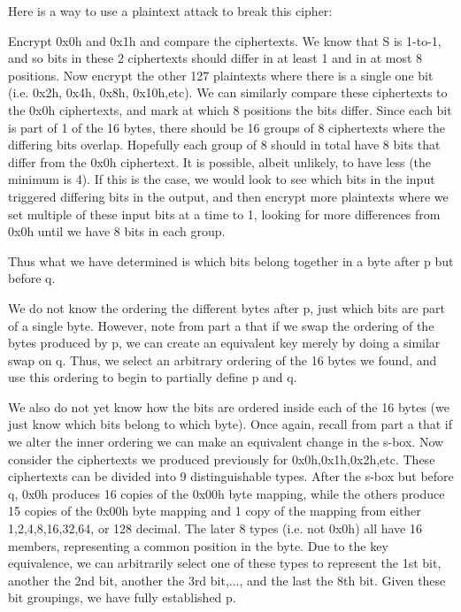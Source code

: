\documentclass[11pt]{article}
\begin{document}
\begin{enumerate}[(a)]
Here is a way to use a plaintext attack to break this cipher:

Encrypt 0x0h and 0x1h and compare the ciphertexts. We know that S is 1-to-1, and so bits in these 2 ciphertexts should differ in at least 1 and in at most 8 positions. Now encrypt  the other 127 plaintexts where there is a single one bit (i.e. 0x2h, 0x4h, 0x8h, 0x10h,etc). We can similarly compare these ciphertexts to the 0x0h ciphertexts, and mark at which 8 positions the bits differ. Since each bit is part of 1 of the 16 bytes, there should be 16 groups of 8 ciphertexts where the differing bits overlap. Hopefully each group of 8 should in total have 8 bits that differ from the 0x0h ciphertext. It is possible, albeit unlikely, to have less (the minimum is 4). If this is the case, we would look
to see which bits in the input triggered differing bits in the output, and then encrypt more plaintexts where we set multiple of these input
bits at a time to 1, looking for more differences from 0x0h until we have 8 bits in each group.

Thus what we have determined is which bits belong together in a byte after p but before q.

We do not know the ordering the different bytes after p, just which bits are part of a single byte. However, note from part a that if we swap the ordering of the bytes produced by p, we can create an equivalent key merely by doing a similar swap on q. Thus, we select an arbitrary ordering of the 16 bytes we found, and use this ordering to begin to partially define p and q.

We also do not yet know how the bits are ordered inside each of the 16 bytes (we just know which bits belong to which byte). Once again, recall from part a that if we alter the inner ordering we can make an equivalent change in the s-box. Now consider the ciphertexts we produced previously for 0x0h,0x1h,0x2h,etc. These ciphertexts can be divided into 9 distinguishable types. After the s-box but before q, 0x0h produces 16 copies of the 0x00h byte mapping, while the others produce 15 copies of the 0x00h byte mapping and 1 copy of the mapping from either 1,2,4,8,16,32,64, or 128 decimal. The later 8 types (i.e. not 0x0h) all have 16 members, representing a common position in the byte. Due to the key equivalence, we can arbitrarily select one of these types to represent the 1st bit, another the 2nd bit, another the 3rd bit,..., and the last the 8th bit. Given these bit groupings, we have fully established p.


\end{enumerate}
\end{document}
